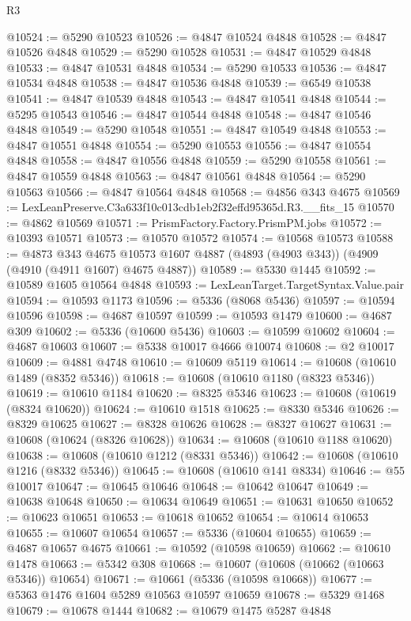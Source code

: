 \begin{lexlean}{R3}
\begin{coremodule}
@10524 := @5290 @10523
@10526 := @4847 @10524 @4848
@10528 := @4847 @10526 @4848
@10529 := @5290 @10528
@10531 := @4847 @10529 @4848
@10533 := @4847 @10531 @4848
@10534 := @5290 @10533
@10536 := @4847 @10534 @4848
@10538 := @4847 @10536 @4848
@10539 := @6549 @10538
@10541 := @4847 @10539 @4848
@10543 := @4847 @10541 @4848
@10544 := @5295 @10543
@10546 := @4847 @10544 @4848
@10548 := @4847 @10546 @4848
@10549 := @5290 @10548
@10551 := @4847 @10549 @4848
@10553 := @4847 @10551 @4848
@10554 := @5290 @10553
@10556 := @4847 @10554 @4848
@10558 := @4847 @10556 @4848
@10559 := @5290 @10558
@10561 := @4847 @10559 @4848
@10563 := @4847 @10561 @4848
@10564 := @5290 @10563
@10566 := @4847 @10564 @4848
@10568 := @4856 @343 @4675
@10569 := LexLeanPreserve.C3a633f10c013cdb1eb2f32effd95365d.R3.__fits_15
@10570 := @4862 @10569
@10571 := PrismFactory.Factory.PrismPM.jobs
@10572 := @10393 @10571
@10573 := @10570 @10572
@10574 := @10568 @10573
@10588 := @4873
    @343
    @4675
    @10573
    @1607
    @4887
    (@4893 (@4903 @343))
    (@4909 (@4910 (@4911 @1607) @4675 @4887))
@10589 := @5330 @1445
@10592 := @10589 @1605 @10564 @4848
@10593 := LexLeanTarget.TargetSyntax.Value.pair
@10594 := @10593 @1173
@10596 := @5336 (@8068 @5436)
@10597 := @10594 @10596
@10598 := @4687 @10597
@10599 := @10593 @1479
@10600 := @4687 @309
@10602 := @5336 (@10600 @5436)
@10603 := @10599 @10602
@10604 := @4687 @10603
@10607 := @5338 @10017 @4666 @10074
@10608 := @2 @10017
@10609 := @4881 @4748
@10610 := @10609 @5119
@10614 := @10608 (@10610 @1489 (@8352 @5346))
@10618 := @10608 (@10610 @1180 (@8323 @5346))
@10619 := @10610 @1184
@10620 := @8325 @5346
@10623 := @10608 (@10619 (@8324 @10620))
@10624 := @10610 @1518
@10625 := @8330 @5346
@10626 := @8329 @10625
@10627 := @8328 @10626
@10628 := @8327 @10627
@10631 := @10608 (@10624 (@8326 @10628))
@10634 := @10608 (@10610 @1188 @10620)
@10638 := @10608 (@10610 @1212 (@8331 @5346))
@10642 := @10608 (@10610 @1216 (@8332 @5346))
@10645 := @10608 (@10610 @141 @8334)
@10646 := @55 @10017
@10647 := @10645 @10646
@10648 := @10642 @10647
@10649 := @10638 @10648
@10650 := @10634 @10649
@10651 := @10631 @10650
@10652 := @10623 @10651
@10653 := @10618 @10652
@10654 := @10614 @10653
@10655 := @10607 @10654
@10657 := @5336 (@10604 @10655)
@10659 := @4687 @10657 @4675
@10661 := @10592 (@10598 @10659)
@10662 := @10610 @1478
@10663 := @5342 @308
@10668 := @10607 (@10608 (@10662 (@10663 @5346)) @10654)
@10671 := @10661 (@5336 (@10598 @10668))
@10677 := @5363 @1476 @1604 @5289 @10563 @10597 @10659
@10678 := @5329 @1468
@10679 := @10678 @1444
@10682 := @10679 @1475 @5287 @4848

\end{coremodule}
\end{lexlean}
